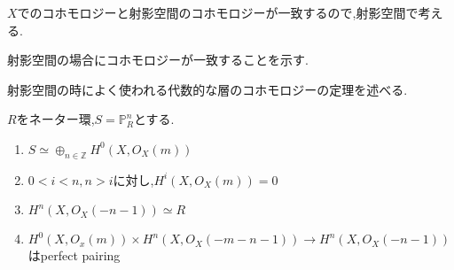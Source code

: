 $X$でのコホモロジーと射影空間のコホモロジーが一致するので,射影空間で考える.

射影空間の場合にコホモロジーが一致することを示す.

射影空間の時によく使われる代数的な層のコホモロジーの定理を述べる.
\begin{thm}\label{cohomology of projective space}
$R$をネーター環,$S=\mathbb{P}_R^n$とする.
  \begin{enumerate}
    \item $S \simeq \oplus_{n \in \mathbb{Z}}H^0(X, O_X(m))$
    \item $0 < i < n, n> i$に対し,$H^i(X, O_X(m)) = 0$
    \item $H^n(X, O_X(-n-1)) \simeq R$
    \item $H^0(X, O_x(m)) \times H^n(X, O_X(-m-n-1)) \to H^n(X, O_X(-n-1))$はperfect pairing
  \end{enumerate}
\end{thm}

